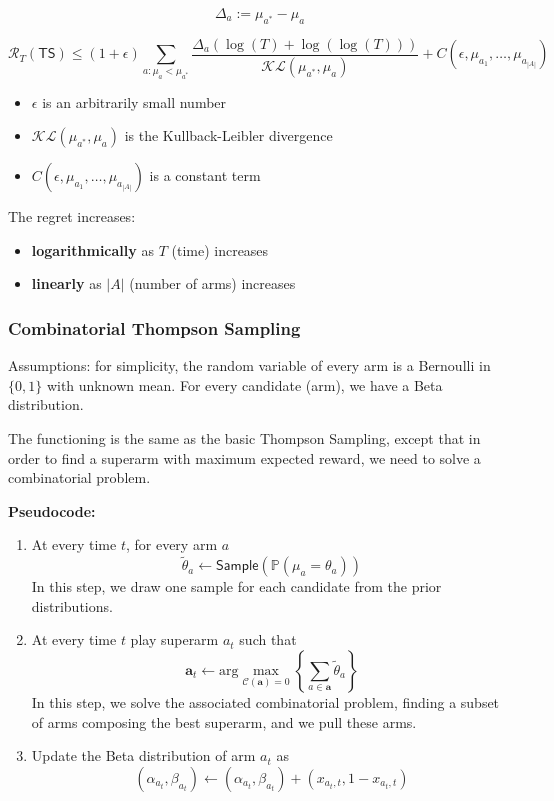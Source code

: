 \documentclass[10pt,a4paper]{article}
\begin{document}
$$\Delta_{a} := \mu_{a^{*}} - \mu_{a}$$

$$\mathscr{R}_{T}(\mathsf{TS}) \leq(1+\epsilon) \sum_{a: \mu_{a}<\mu_{a^{*}}} \frac{\Delta_{a}(\log (T)+\log (\log (T)))}{\mathscr{KL} \left(\mu_{a^{*}}, \mu_{a}\right)}+C\left(\epsilon, \mu_{a_{1}}, \ldots, \mu_{a_{|A|}}\right)$$

\begin{itemize}
\item $\epsilon$ is an arbitrarily small number
\item $\mathscr{KL} \left(\mu_{a^{*}}, \mu_{a}\right)$ is the Kullback-Leibler divergence
\item $C\left(\epsilon, \mu_{a_{1}}, \ldots, \mu_{a_{|A|}}\right)$ is a constant term
\end{itemize}

The regret increases:

\begin{itemize}
\item \textbf{logarithmically} as $T$ (time) increases
\item \textbf{linearly} as $|A|$ (number of arms) increases
\end{itemize}

\subsubsection{Combinatorial Thompson
Sampling}\label{combinatorial-thompson-sampling}

Assumptions: for simplicity, the random variable of every arm is a Bernoulli in $\{0, 1\}$ with unknown mean. For every candidate (arm), we have a Beta distribution.

The functioning is the same as the basic Thompson Sampling, except that in order to find a superarm with maximum expected reward, we need to solve a combinatorial problem.
\newline

\textbf{Pseudocode:}

\begin{enumerate}
\item At every time $t$, for every arm $a$
$$\tilde{\theta}_a \leftarrow \mathsf{Sample}(\mathbb{P}(\mu_a = \theta_a))$$
In this step, we draw one sample for each candidate from the prior distributions.
\item At every time $t$ play superarm $a_t$ such that
$$\mathbf{a}_t \leftarrow \text{arg} \max_{\mathscr{C}(\mathbf{a})= 0} \left\{ \sum_{a \in \mathbf{a}} \tilde{\theta}_a \right\}$$
In this step, we solve the associated combinatorial problem, finding a subset of arms composing the best superarm, and we pull these arms.
\item Update the Beta distribution of arm $a_t$ as
$$(\alpha_{a_t}, \beta_{a_t}) \leftarrow (\alpha_{a_t}, \beta_{a_t}) + (x_{a_t, t}, 1 - x_{a_t, t})$$
\end{enumerate}
\end{document}
